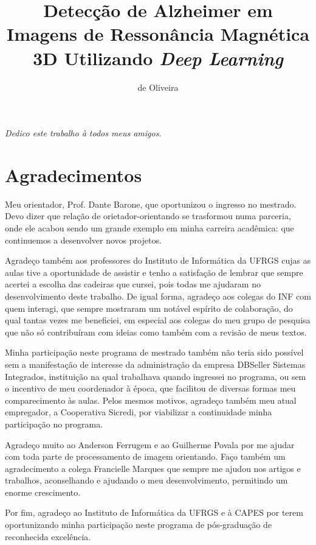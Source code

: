 \documentclass[openright]{UFRGS} %
\author{de Oliveira}{Augusto Berwaldt}
\title{Detecção de Alzheimer em Imagens de Ressonância Magnética 3D Utilizando \it{Deep Learning}}
\begin{document}
\maketitle

\clearpage
\begin{flushright}
\mbox{}\vfill
{\sffamily\itshape
Dedico este trabalho à todos meus amigos.}
\end{flushright}

\chapter*{Agradecimentos}


Meu orientador, Prof. Dante Barone, que oportunizou o ingresso no mestrado. Devo dizer que relação de orietador-orientando se trasformou numa parceria, onde ele acabou sendo um grande exemplo em minha carreira acadêmica: que continuemos a desenvolver novos projetos.

Agradeço também aos professores do Instituto de Informática da UFRGS cujas
as aulas tive a oportunidade de assistir e tenho a satisfação de lembrar que sempre acertei a escolha das cadeiras que cursei, pois todas me ajudaram no desenvolvimento deste
trabalho. De igual forma, agradeço aos colegas do INF com quem interagi, que sempre
mostraram um notável espírito de colaboração, do qual tantas vezes me beneficiei, em
especial aos colegas do meu grupo de pesquisa que não só contribuíram com ideias como
também com a revisão de meus textos.

Minha participação neste programa de mestrado também não teria sido possível
sem a manifestação de interesse da administração da empresa DBSeller Sistemas Integrados, instituição
na qual trabalhava quando ingressei no programa, ou sem o incentivo de meu coordenador
à época, que facilitou de diversas formas meu comparecimento às aulas. Pelos mesmos
motivos, agradeço também meu atual empregador, a Cooperativa Sicredi, por viabilizar a continuidade minha participação no programa.

Agradeço muito ao Anderson Ferrugem e ao Guilherme Povala  por me ajudar com toda parte de processamento de imagem orientando. Faço também um agradecimento a colega Francielle Marques que sempre me ajudou nos artigos e trabalhos, aconselhando e ajudando o meu desenvolvimento, permitindo um enorme crescimento. 

Por fim, agradeço ao Instituto de Informática da UFRGS e à CAPES por terem
oportunizando minha participação neste programa de pós-graduação de reconhecida excelência.
\end{document}

